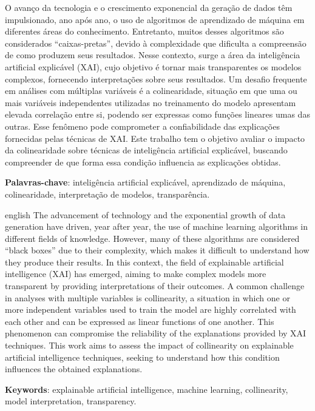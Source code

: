 
\setlength{\absparsep}{18pt} %
\begin{resumo}
 O avanço da tecnologia e o crescimento exponencial da geração de dados têm impulsionado, ano após ano, o uso de algoritmos de aprendizado de máquina em diferentes áreas do conhecimento. Entretanto, muitos desses algoritmos são considerados “caixas-pretas”, devido à complexidade que dificulta a compreensão de como produzem seus resultados. Nesse contexto, surge a área da inteligência artificial explicável (XAI), cujo objetivo é tornar mais transparentes os modelos complexos, fornecendo interpretações sobre seus resultados. Um desafio frequente em análises com múltiplas variáveis é a colinearidade, situação em que uma ou mais variáveis independentes utilizadas no treinamento do modelo apresentam elevada correlação entre si, podendo ser expressas como funções lineares umas das outras. Esse fenômeno pode comprometer a confiabilidade das explicações fornecidas pelas técnicas de XAI. Este trabalho tem o objetivo avaliar o impacto da colinearidade sobre técnicas de inteligência artificial explicável, buscando compreender de que forma essa condição influencia as explicações obtidas.


 \textbf{Palavras-chave}: inteligência artificial explicável, aprendizado de máquina, colinearidade, interpretação de modelos, transparência.
\end{resumo}

\begin{resumo}[Abstract]
 \begin{otherlanguage*}{english}
   The advancement of technology and the exponential growth of data generation have driven, year after year, the use of machine learning algorithms in different fields of knowledge. However, many of these algorithms are considered “black boxes” due to their complexity, which makes it difficult to understand how they produce their results. In this context, the field of explainable artificial intelligence (XAI) has emerged, aiming to make complex models more transparent by providing interpretations of their outcomes. A common challenge in analyses with multiple variables is collinearity, a situation in which one or more independent variables used to train the model are highly correlated with each other and can be expressed as linear functions of one another. This phenomenon can compromise the reliability of the explanations provided by XAI techniques. This work aims to assess the impact of collinearity on explainable artificial intelligence techniques, seeking to understand how this condition influences the obtained explanations.

   \vspace{\onelineskip}
 
   \noindent 
   \textbf{Keywords}: explainable artificial intelligence, machine learning, collinearity, model interpretation, transparency.
 \end{otherlanguage*}
\end{resumo}
